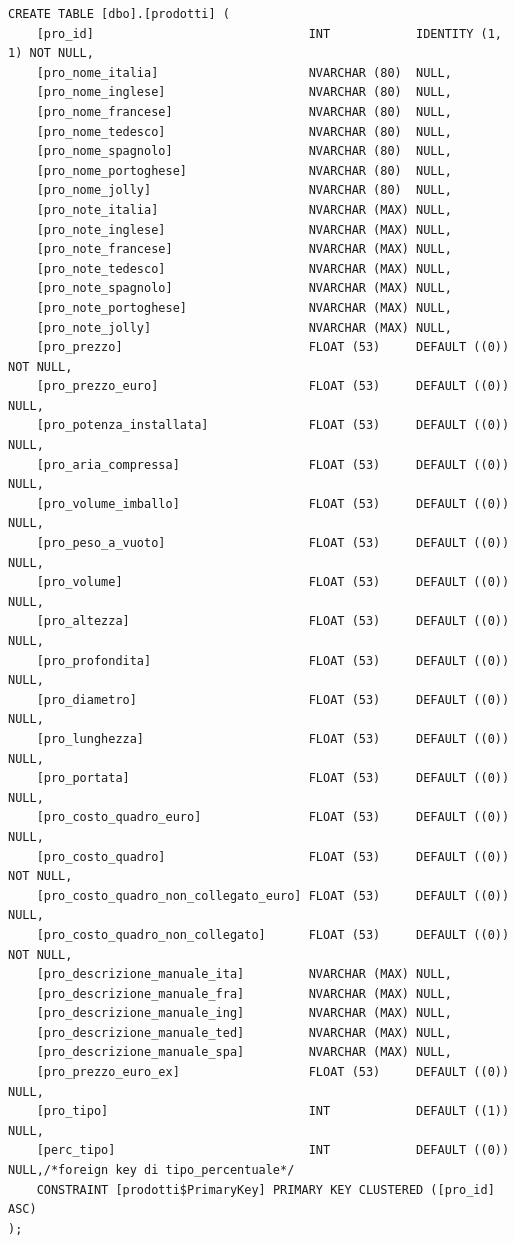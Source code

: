 \documentclass[12pt]{article}
\begin{document}
\begin{lstlisting}
CREATE TABLE [dbo].[prodotti] (
    [pro_id]                              INT            IDENTITY (1, 1) NOT NULL,
    [pro_nome_italia]                     NVARCHAR (80)  NULL,
    [pro_nome_inglese]                    NVARCHAR (80)  NULL,
    [pro_nome_francese]                   NVARCHAR (80)  NULL,
    [pro_nome_tedesco]                    NVARCHAR (80)  NULL,
    [pro_nome_spagnolo]                   NVARCHAR (80)  NULL,
    [pro_nome_portoghese]                 NVARCHAR (80)  NULL,
    [pro_nome_jolly]                      NVARCHAR (80)  NULL,
    [pro_note_italia]                     NVARCHAR (MAX) NULL,
    [pro_note_inglese]                    NVARCHAR (MAX) NULL,
    [pro_note_francese]                   NVARCHAR (MAX) NULL,
    [pro_note_tedesco]                    NVARCHAR (MAX) NULL,
    [pro_note_spagnolo]                   NVARCHAR (MAX) NULL,
    [pro_note_portoghese]                 NVARCHAR (MAX) NULL,
    [pro_note_jolly]                      NVARCHAR (MAX) NULL,
    [pro_prezzo]                          FLOAT (53)     DEFAULT ((0)) NOT NULL,
    [pro_prezzo_euro]                     FLOAT (53)     DEFAULT ((0)) NULL,    
    [pro_potenza_installata]              FLOAT (53)     DEFAULT ((0)) NULL,
    [pro_aria_compressa]                  FLOAT (53)     DEFAULT ((0)) NULL,
    [pro_volume_imballo]                  FLOAT (53)     DEFAULT ((0)) NULL,
    [pro_peso_a_vuoto]                    FLOAT (53)     DEFAULT ((0)) NULL,
    [pro_volume]                          FLOAT (53)     DEFAULT ((0)) NULL,
    [pro_altezza]                         FLOAT (53)     DEFAULT ((0)) NULL,
    [pro_profondita]                      FLOAT (53)     DEFAULT ((0)) NULL,
    [pro_diametro]                        FLOAT (53)     DEFAULT ((0)) NULL,
    [pro_lunghezza]                       FLOAT (53)     DEFAULT ((0)) NULL,
    [pro_portata]                         FLOAT (53)     DEFAULT ((0)) NULL,
    [pro_costo_quadro_euro]               FLOAT (53)     DEFAULT ((0)) NULL,    
    [pro_costo_quadro]                    FLOAT (53)     DEFAULT ((0)) NOT NULL,    
    [pro_costo_quadro_non_collegato_euro] FLOAT (53)     DEFAULT ((0)) NULL,    
    [pro_costo_quadro_non_collegato]      FLOAT (53)     DEFAULT ((0)) NOT NULL,    
    [pro_descrizione_manuale_ita]         NVARCHAR (MAX) NULL, 
    [pro_descrizione_manuale_fra]         NVARCHAR (MAX) NULL,
    [pro_descrizione_manuale_ing]         NVARCHAR (MAX) NULL,
    [pro_descrizione_manuale_ted]         NVARCHAR (MAX) NULL,
    [pro_descrizione_manuale_spa]         NVARCHAR (MAX) NULL,
    [pro_prezzo_euro_ex]                  FLOAT (53)     DEFAULT ((0)) NULL,
    [pro_tipo]                            INT            DEFAULT ((1)) NULL,
    [perc_tipo]                           INT            DEFAULT ((0)) NULL,/*foreign key di tipo_percentuale*/
    CONSTRAINT [prodotti$PrimaryKey] PRIMARY KEY CLUSTERED ([pro_id] ASC)
);
\end{lstlisting}
\end{document}
